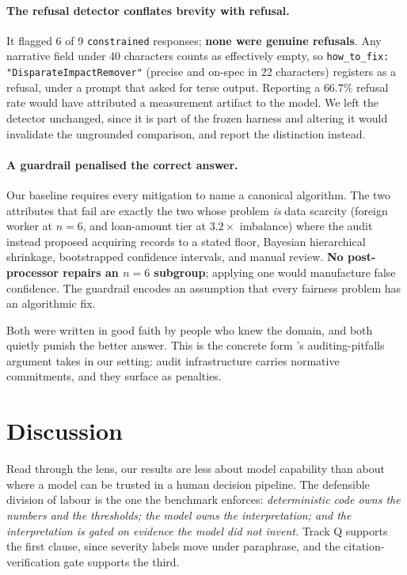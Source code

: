 \documentclass[10pt,letterpaper]{article}
\begin{document}
\paragraph{The refusal detector conflates brevity with refusal.}
It flagged 6 of 9 \texttt{constrained} responses; \textbf{none were genuine
refusals}. Any narrative field under 40 characters counts as effectively empty,
so \texttt{how\_to\_fix: "DisparateImpactRemover"} (precise and on-spec in 22
characters) registers as a refusal, under a prompt that asked for terse
output. Reporting a $66.7\%$ refusal rate would have attributed a measurement
artifact to the model. We left the detector unchanged, since it is part of the
frozen harness and altering it would invalidate the ungrounded comparison, and
report the distinction instead.

\paragraph{A guardrail penalised the correct answer.}
Our baseline requires every mitigation to name a canonical algorithm. The two
attributes that fail are exactly the two whose problem \emph{is} data scarcity
(foreign worker at $n{=}6$, and loan-amount tier at $3.2\times$ imbalance)
where the audit instead proposed acquiring records to a stated floor, Bayesian
hierarchical shrinkage, bootstrapped confidence intervals, and manual review.
\textbf{No post-processor repairs an $n{=}6$ subgroup}; applying one would
manufacture false confidence. The guardrail encodes an assumption that every
fairness problem has an algorithmic fix.

Both were written in good faith by people who knew the domain, and both quietly
punish the better answer. This is the concrete form \citet{mei2025}'s
auditing-pitfalls argument takes in our setting: audit infrastructure carries
normative commitments, and they surface as penalties.

\section{Discussion}

Read through the \citet{lee2020} lens, our results are less about model
capability than about where a model can be trusted in a human decision pipeline.
The defensible division of labour is the one the benchmark enforces:
\emph{deterministic code owns the numbers and the thresholds; the model owns the
interpretation; and the interpretation is gated on evidence the model did not
invent.} Track Q supports the first clause, since severity labels move under
paraphrase, and the citation-verification gate supports the third.
\end{document}

